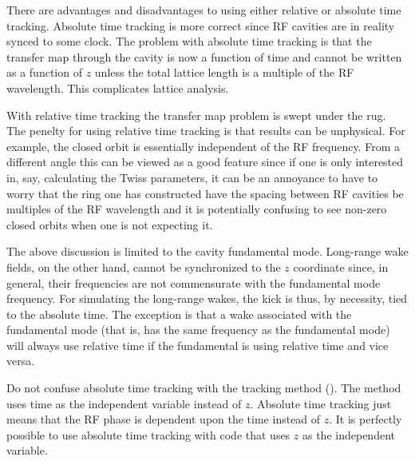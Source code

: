 There are advantages and disadvantages to using either relative or
absolute time tracking. Absolute time tracking is more correct since
RF cavities are in reality synced to some clock. The problem with
absolute time tracking is that the transfer map through the cavity is
now a function of time and cannot be written as a function of $z$
unless the total lattice length is a multiple of the RF wavelength.
This complicates lattice analysis.

With relative time tracking the transfer map problem is swept under
the rug. The penelty for using relative time tracking is that results
can be unphysical. For example, the closed orbit is essentially
independent of the RF frequency. From a different angle this can be
viewed as a good feature since if one is only interested in, say,
calculating the Twiss parameters, it can be an annoyance to have to
worry that the ring one has constructed have the spacing between RF
cavities be multiples of the RF wavelength and it is potentially
confusing to see non-zero closed orbits when one is not expecting it.

The above discussion is limited to the cavity fundamental mode.
Long-range wake fields, on the other hand, cannot be synchronized to
the $z$ coordinate since, in general, their frequencies are not
commensurate with the fundamental mode frequency. For simulating the
long-range wakes, the kick is thus, by necessity, tied to the absolute
time. The exception is that a wake associated with the fundamental
mode (that is, has the same frequency as the fundamental mode) will
always use relative time if the fundamental is using relative time and
vice versa.

Do not confuse absolute time tracking with the 
tracking method (). The  method uses
time as the independent variable instead of $z$. Absolute time
tracking just means that the RF phase is dependent upon the time
instead of $z$. It is perfectly possible to use absolute time
tracking with code that uses $z$ as the independent variable.

